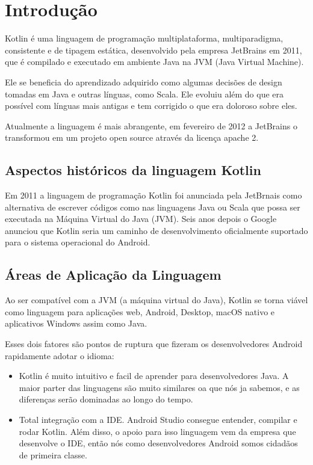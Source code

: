 

\chapter{ Introdu\c{c}\~{a}o}

Kotlin é uma linguagem de programação multiplataforma,
multiparadigma, consistente e de tipagem estática, 
desenvolvido pela empresa JetBrains em 2011, que é
compilado e executado em ambiente Java na JVM 
(Java Virtual Machine). 

Ele se beneficia do aprendizado adquirido como algumas decisões de design tomadas em Java e outras línguas,
como Scala. Ele evoluiu além do que era possível com línguas mais antigas e tem
corrigido o que era doloroso sobre eles.

Atualmente a linguagem é mais 
abrangente, em fevereiro de 2012 a JetBrains  o transformou
em um projeto open source através da licença apache 2.


\section{Aspectos hist\'{o}ricos da linguagem Kotlin}
Em 2011 a linguagem de programaç\~{a}o Kotlin foi anunciada pela JetBrnais como alternativa
de escrever códigos como nas linguagens Java ou Scala que possa ser executada na Máquina Virtual do Java
(JVM). Seis anos depois o Google anunciou que Kotlin seria um caminho de 
desenvolvimento oficialmente suportado para o sistema operacional do Android.\cite{fazio2021kotlin} 

\section{\'{A}reas de Aplica\c{c}\~{a}o da Linguagem}
Ao ser compatível com a JVM (a máquina virtual do Java), 
Kotlin se torna viável como linguagem para aplicações web, 
Android, Desktop, macOS nativo e aplicativos Windows assim como Java.

Esses dois fatores são pontos de ruptura que fizeram os
desenvolvedores Android rapidamente adotar o idioma:
\begin{itemize}
	\item Kotlin é muito intuitivo e facil de aprender para desenvolvedores Java.
	A maior parter das linguagens são muito similares oa que nós ja sabemos, e as diferenças
   serão dominadas ao longo do tempo.
	
	\item Total integração com a IDE. Android Studio consegue entender,
    compilar e rodar Kotlin. Além disso, o apoio para isso
    linguagem vem da empresa que desenvolve o IDE, então nós como desenvolvedores Android
     somos cidadãos de primeira classe. 
	
\end{itemize}

